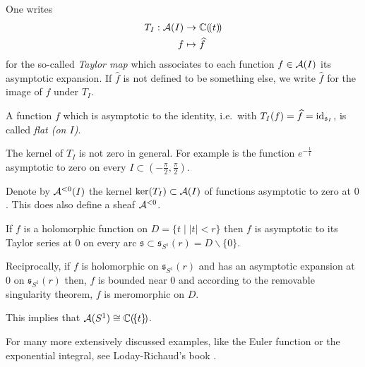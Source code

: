 One writes
\begin{align*}
  T_{I}:\mathcal{A}(I)&\to\mathbb{C}(\!(t)\!)
  \\f&\mapsto\widehat f
\end{align*}
for the so-called \emph{Taylor map} which associates to each function
$f\in\mathcal{A}(I)$ its asymptotic expansion.
If $\hat f$ is not defined to be something else, we write $\hat f$ for the image
of $f$ under $T_{I}$.
\begin{defn}
  A function $f$ which is asymptotic to the identity, i.e.\ with
  $T_{I}(f)=\widehat f=\operatorname{id}_{\mathfrak{s}_I}$, is called \emph{flat (on $I$)}.
\end{defn}

The kernel of $T_{I}$ is not zero in general.
For example is the function $e^{-\frac{1}{t}}$ asymptotic to zero on every
$I\subset\left(-\frac{\pi}{2},\frac{\pi}{2}\right)$.
\begin{defn}
  Denote by $\mathcal{A}^{<0}(I)$ the kernel $\ker(T_{I})\subset\mathcal{A}(I)$ of functions
  asymptotic to zero at $0$. This does also define a sheaf $\mathcal{A}^{<0}$.
\end{defn}

\begin{exmp}
  If $f$ is a holomorphic function on $D=\{t\mid |t|<r\}$ then $f$ is asymptotic
  to its Taylor series at $0$ on every arc
  $\mathfrak{s}\subset\mathfrak{s}_{S^1}(r)=D\backslash\{0\}$.

  Reciprocally, if $f$ is holomorphic on $\mathfrak{s}_{S^1}(r)$ and has an
  asymptotic expansion at $0$ on $\mathfrak{s}_{S^1}(r)$ then, $f$ is bounded
  near $0$ and according to the removable singularity theorem, $f$ is
  meromorphic on $D$.
  \begin{s-rem}
    This implies that $\mathcal{A}(S^1)\cong\mathbb{C}(\!\{t\}\!)$.
  \end{s-rem}
\end{exmp}
For many more extensively discussed examples, like the Euler function or the
exponential integral, see Loday-Richaud's book \cite[Sec.2.2]{Loday2014}.

